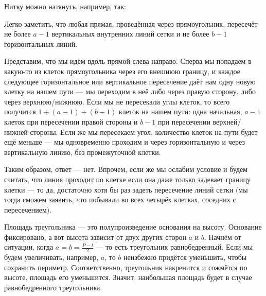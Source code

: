 \begin{itemize}
\itA Нитку можно натянуть, например, так:

\begin{center}\end{center}

\itB Легко заметить, что любая прямая, проведённая через прямоугольник, пересечёт не более $a-1$
вертикальных внутренних линий сетки и не более $b-1$ горизонтальных линий. 

Представим, что мы идём вдоль прямой слева направо. Сперва мы попадаем в какую-то из клеток прямоугольника через его внешнюю границу, и каждое следующее горизонтальное или вертикальное пересечение даёт нам одну новую клетку на нашем пути --- мы переходим в неё либо через правую сторону, либо через верхнюю/нижнюю. Если мы не пересекали углы клеток, то всего получится $1 + (a-1) + (b-1)$ клеток на нашем пути: одна начальная, $a-1$ клеток при пересечении правой стороны и $b-1$ при пересечении верхней/нижней стороны. Если же мы пересекаем угол, количество клеток на пути будет ещё меньше --- мы одновременно проходим и через горизонтальную и через вертикальную линию, без промежуточной клетки.

Таким образом, ответ --- нет. Впрочем, если же мы ослабим условие и будем считать, что линия проходит по клетке если она даже только задевает границу клетки --- то да, достаточно хотя бы раз задеть пересечение линий сетки (мы тогда сможем заявить, что побывали во всех четырёх клетках, соседних с пересечением). 

\itC Площадь треугольника --- это полупроизведение основания на высоту. Основание фиксировано, а вот
высота зависит от двух других сторон $a$ и $b$. Начнём от ситуации, когда $a = b = \frac{P-l}{2}$ --- то есть треугольник равнобедренный. Если мы будем увеличивать, например, $a$, то $b$ неизбежно придётся уменьшить,
чтобы сохранить периметр. Соответственно, треугольник накренится и сожмётся по высоте, площадь его уменьшится.
Значит, наибольшая площадь будет в случае равнобедренного треугольника.


\end{itemize}
